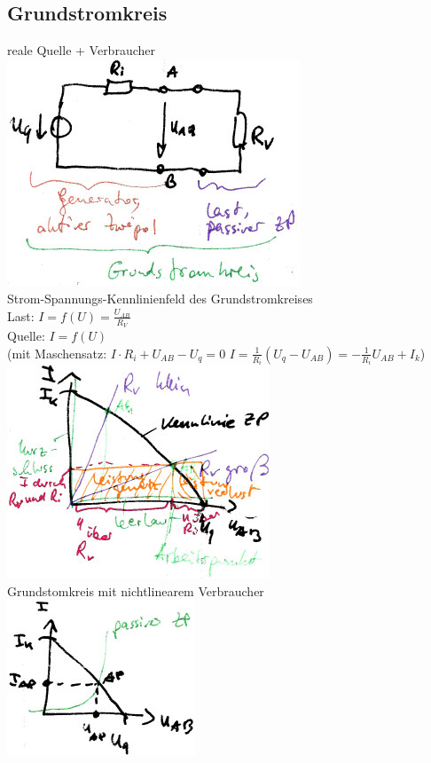 \subsection{Grundstromkreis}
reale Quelle + Verbraucher\\
\includegraphics[scale=.75]{Abbildungen/ABB310}\\
Strom-Spannungs-Kennlinienfeld des Grundstromkreises\\
Last: $I=f(U)=\frac{U_{AB}}{R_V}$\\
Quelle: $I=f(U)$ \\
(mit Maschensatz: $I\cdot R_i + U_{AB}-U_q=0$ \qquad $I=\frac{1}{R_i}(U_q-U_{AB})=-\frac{1}{R_i}U_{AB}+I_k$)\\
\includegraphics[scale=.75]{Abbildungen/ABB311}\\
Grundstomkreis mit nichtlinearem Verbraucher\\
\includegraphics[scale=.75]{Abbildungen/ABB312}\\
